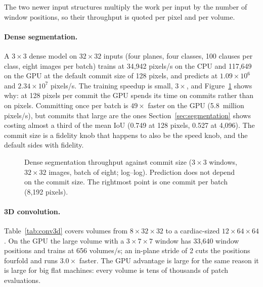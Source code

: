 The two newer input structures multiply the work per input by the number of window
positions, so their throughput is quoted per pixel and per volume.

\paragraph{Dense segmentation.}
A $3\times3$ dense model on $32\times32$ inputs (four planes, four classes, 100 clauses per
class, eight images per batch) trains at 34{,}942 pixels/s on the CPU and 117{,}649 on the
GPU at the default commit size of 128 pixels, and predicts at $1.09\times10^{6}$ and
$2.34\times10^{7}$ pixels/s. The training speedup is small, $3\times$, and
Figure~\ref{fig:bench-seg} shows why: at 128 pixels per commit the GPU spends its time on
commits rather than on pixels. Committing once per batch is $49\times$ faster on the GPU
(5.8~million pixels/s), but commits that large are the ones Section~\ref{sec:segmentation}
shows costing almost a third of the mean IoU (0.749 at 128 pixels, 0.527 at 4{,}096). The commit size is a fidelity knob that happens to also be the
speed knob, and the default sides with fidelity.

\begin{figure}[htbp]
\centering

\caption{Dense segmentation throughput against commit size ($3\times3$ windows,
  $32\times32$ images, batch of eight; log--log). Prediction does not depend on the commit
  size. The rightmost point is one commit per batch (8{,}192 pixels).}
\label{fig:bench-seg}
\end{figure}

\paragraph{3D convolution.}
Table~\ref{tab:conv3d} covers volumes from $8\times32\times32$ to a cardiac-sized
$12\times64\times64$. On the GPU the large volume with a $3\times7\times7$ window has
33{,}640 window positions and trains at 656 volumes/s; an in-plane stride of 2 cuts the
positions fourfold and runs $3.0\times$ faster. The GPU advantage is large for the same reason
it is large for big flat machines: every volume is tens of thousands of patch evaluations.

